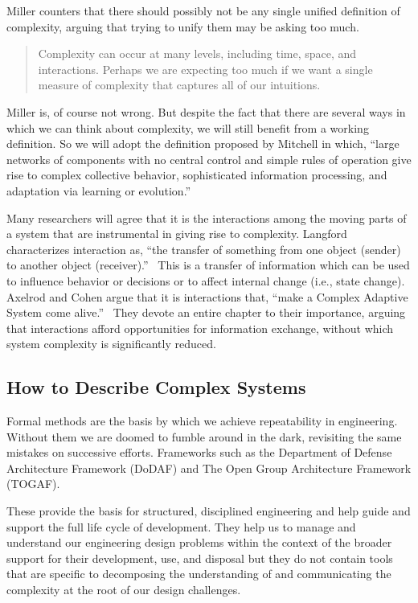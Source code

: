 \documentclass[jou,apacite]{apa6}
\begin{document}
Miller counters that there should possibly not be any single unified definition of complexity, arguing that trying to unify them may be asking too much.
\begin{quotation}
  Complexity can occur at many levels, including time, space, and interactions.  Perhaps we are expecting too much if we want a single measure of complexity that captures all of our intuitions.~\cite[page 234]{Miller}
\end{quotation}

Miller is, of course not wrong.  But despite the fact that there are several ways in which we can think about complexity, we will still benefit from a working definition.  So we will adopt the definition proposed by Mitchell in which, ``large networks of components with no central control and simple rules of operation give rise to complex collective behavior, sophisticated information processing, and adaptation via learning or evolution.''~\cite[page 13]{Mitchell}

Many researchers will agree that it is the interactions among the moving parts of a system that are instrumental in giving rise to complexity.  Langford characterizes interaction as, ``the transfer of something from one object (sender) to another object (receiver).''~\cite[page 48]{Langford}  This is a transfer of information which can be used to influence behavior or decisions or to affect internal change (i.e., state change).  Axelrod and Cohen argue that it is interactions that, ``make a Complex Adaptive System come alive.''~\cite[page 63]{Axelrod} They devote an entire chapter to their importance, arguing that interactions afford opportunities for information exchange, without which system complexity is significantly reduced.  


\subsection{How to Describe Complex Systems}  %
Formal methods are the basis by which we achieve repeatability in engineering.  Without them we are doomed to fumble around in the dark, revisiting the same mistakes on successive efforts.  Frameworks such as the Department of Defense Architecture Framework (DoDAF) and The Open Group Architecture Framework (TOGAF).  

These provide the basis for structured, disciplined engineering and help guide and support the full life cycle of development.  They help us to manage and understand our engineering design problems within the context of the broader support for their development, use, and disposal but they do not contain tools that are specific to decomposing the understanding of and communicating the complexity at the root of our design challenges.
\end{document}
